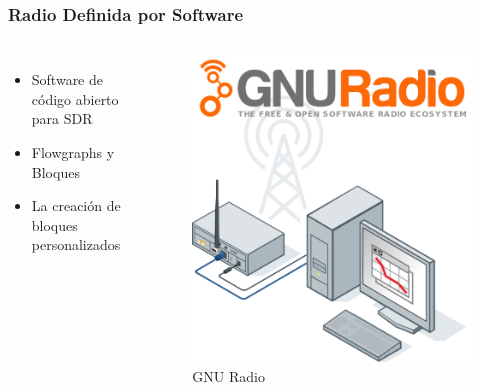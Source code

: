 \begin{frame}
\frametitle{Radio Definida por Software}
\begin{columns}
	\begin{itemize}	
		\item { Software de código abierto para SDR}
		\item {	Flowgraphs y Bloques }
		\item { La creación de bloques personalizados }
	\end{itemize}
	\begin{figure}
		\includegraphics[scale=0.25]{sdr}
		\caption{GNU Radio}
	\end{figure}
\end{columns}
\end{frame}

